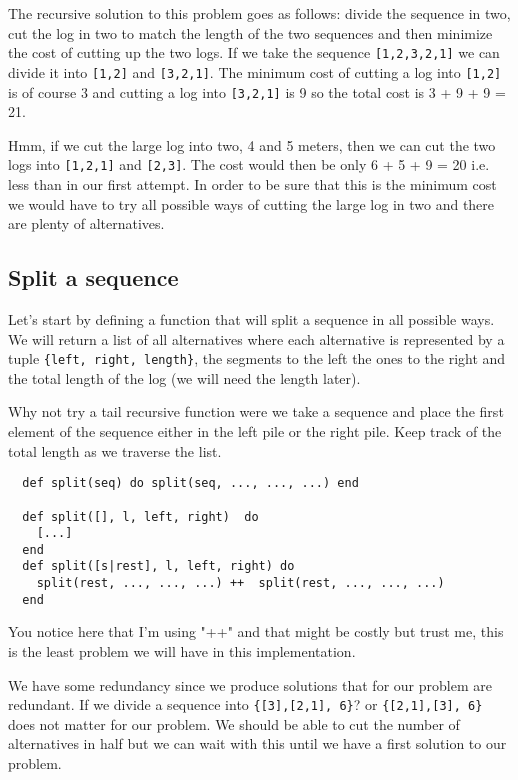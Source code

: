 \documentclass[a4paper,11pt]{article}
\begin{document}
The recursive solution to this problem goes as follows: divide the
sequence in two, cut the log in two to match the length of the two
sequences and then minimize the cost of cutting up the two logs. If we
take the sequence {\tt [1,2,3,2,1]} we can divide it into {\tt [1,2]}
and {\tt [3,2,1]}. The minimum cost of cutting a log into {\tt [1,2]}
is of course 3 and cutting a log into {\tt [3,2,1]} is 9 so the total
cost is 3 + 9 + 9 = 21.

Hmm, if we cut the large log into two, 4 and 5 meters, then we can cut
the two logs into {\tt [1,2,1]} and {\tt [2,3]}. The cost would then
be only 6 + 5 + 9 = 20 i.e. less than in our first attempt. In order
to be sure that this is the minimum cost we would have to try all
possible ways of cutting the large log in two and there are plenty of
alternatives.

\subsection*{Split a sequence}

Let's start by defining a function that will split a sequence in all
possible ways. We will return a list of all alternatives where each
alternative is represented by a tuple {\tt\{left, right, length\}},
the segments to the left the ones to the right and the total length of
the log (we will need the length later).

Why not try a tail recursive function were we take a sequence
and place the first element of the sequence either in the left pile or
the right pile. Keep track of the total length as we traverse the list. 

\begin{verbatim}
  def split(seq) do split(seq, ..., ..., ...) end

  def split([], l, left, right)  do
    [...]
  end
  def split([s|rest], l, left, right) do
    split(rest, ..., ..., ...) ++  split(rest, ..., ..., ...)
  end
\end{verbatim}

You notice here that I'm using "++" and that might be costly but trust
me, this is the least problem we will have in this implementation.

We have some redundancy since we produce solutions that for our
problem are redundant. If we divide a sequence into {\tt\{[3],[2,1],
  6\}}? or {\tt\{[2,1],[3], 6\}} does not matter for our problem. We
should be able to cut the number of alternatives in half but we can
wait with this until we have a first solution to our problem.
\end{document}
